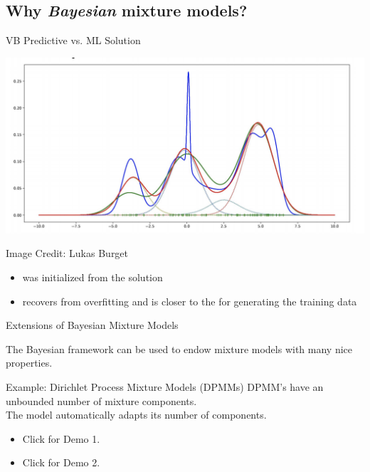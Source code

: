 \documentclass[10pt]{beamer}
\begin{document}
\subsection{Why \textit{Bayesian} mixture models?} 
\begin{frame}{VB Predictive vs. ML Solution}

\begin{center}
\includegraphics[width=.9\textwidth]{images/ml_vs_vb}
\end{center}
\hfill \tiny{Image Credit: Lukas Burget} \normalsize

\begin{itemize}
\item {} was initialized from the  solution 
\item {} recovers from  overfitting and is closer to the  for generating the training data
\end{itemize}

\end{frame}

\begin{frame}{Extensions of Bayesian Mixture Models}

The Bayesian framework can be used to endow mixture models with many nice properties.
\vfill
{}
\begin{block}{Example: Dirichlet Process Mixture Models (DPMMs)}
DPMM's have an unbounded number of mixture components.   \\
\vfill
The model automatically adapts its number of components.

\begin{itemize}
\item Click  for Demo 1.
\item Click  for Demo 2.
\end{itemize}
\end{block}



\end{frame}
\end{document}
